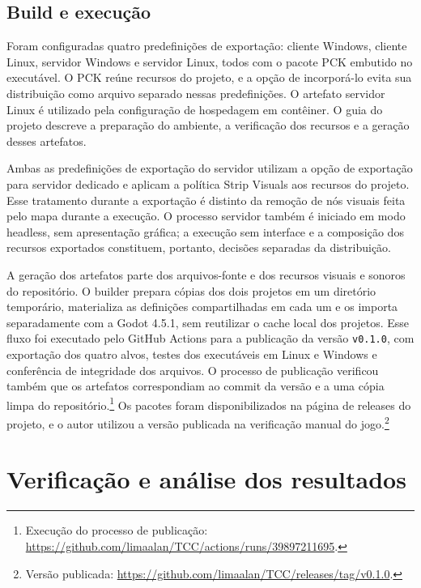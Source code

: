 \subsection{Build e execução}\label{sec:5.2.11}

Foram configuradas quatro predefinições de exportação: cliente Windows, cliente Linux, servidor Windows e servidor Linux, todos com o pacote PCK embutido no executável. O PCK reúne recursos do projeto, e a opção de incorporá-lo evita sua distribuição como arquivo separado nessas predefinições. O artefato servidor Linux é utilizado pela configuração de hospedagem em contêiner. O guia do projeto descreve a preparação do ambiente, a verificação dos recursos e a geração desses artefatos. \cite{GODOT-SERVER}

Ambas as predefinições de exportação do servidor utilizam a opção de exportação para servidor dedicado e aplicam a política Strip Visuals aos recursos do projeto. Esse tratamento durante a exportação é distinto da remoção de nós visuais feita pelo mapa durante a execução. O processo servidor também é iniciado em modo headless, sem apresentação gráfica; a execução sem interface e a composição dos recursos exportados constituem, portanto, decisões separadas da distribuição. \cite{GODOT-SERVER}

A geração dos artefatos parte dos arquivos-fonte e dos recursos visuais e sonoros do repositório. O builder prepara cópias dos dois projetos em um diretório temporário, materializa as definições compartilhadas em cada um e os importa separadamente com a Godot 4.5.1, sem reutilizar o cache local dos projetos. Esse fluxo foi executado pelo GitHub Actions para a publicação da versão \texttt{v0.1.0}, com exportação dos quatro alvos, testes dos executáveis em Linux e Windows e conferência de integridade dos arquivos. O processo de publicação verificou também que os artefatos correspondiam ao commit da versão e a uma cópia limpa do repositório.\footnote{Execução do processo de publicação: \url{https://github.com/limaalan/TCC/actions/runs/39897211695}.} Os pacotes foram disponibilizados na página de releases do projeto, e o autor utilizou a versão publicada na verificação manual do jogo.\footnote{Versão publicada: \url{https://github.com/limaalan/TCC/releases/tag/v0.1.0}.}

\section{Verificação e análise dos resultados}\label{sec:5.3}

